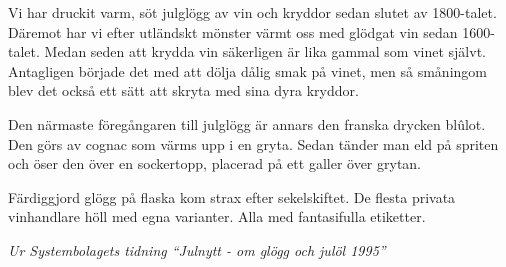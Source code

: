 \vspace{10pt}
\noindent\hspace*{10pt}
Vi har druckit varm, söt julglögg av vin och kryddor sedan slutet av
1800-talet. Däremot har vi efter utländskt mönster värmt oss med
glödgat vin sedan 1600-talet. Medan seden att krydda vin säkerligen är
lika gammal som vinet självt. Antagligen började det med att dölja
dålig smak på vinet, men så småningom blev det också ett sätt att
skryta med sina dyra kryddor.\par
\noindent\hspace*{10pt}
Den närmaste föregångaren till julglögg är annars den franska drycken
blûlot. Den görs av cognac som värms upp i en gryta. Sedan tänder man
eld på spriten och öser den över en sockertopp, placerad på ett galler
över grytan.\par
\noindent\hspace*{10pt}
Färdiggjord glögg på flaska kom strax efter sekelskiftet. De flesta
privata vinhandlare höll med egna varianter. Alla med fantasifulla
etiketter.\par
\vspace{10pt}
{\footnotesize\textit{Ur Systembolagets tidning ``Julnytt - om glögg
och julöl 1995''}}
